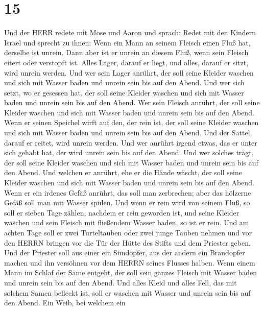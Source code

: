 \hypertarget{section-14}{%
\section{15}\label{section-14}}

 Und der HERR redete mit Mose und Aaron und sprach:
 Redet mit den Kindern Israel und sprecht zu ihnen: Wenn ein
Mann an seinem Fleisch einen Fluß hat, derselbe ist unrein. 
Dann aber ist er unrein an diesem Fluß, wenn sein Fleisch eitert oder
verstopft ist.  Alles Lager, darauf er liegt, und alles,
darauf er sitzt, wird unrein werden.  Und wer sein Lager
anrührt, der soll seine Kleider waschen und sich mit Wasser baden und
unrein sein bis auf den Abend.  Und wer sich setzt, wo er
gesessen hat, der soll seine Kleider waschen und sich mit Wasser baden
und unrein sein bis auf den Abend.  Wer sein Fleisch
anrührt, der soll seine Kleider waschen und sich mit Wasser baden und
unrein sein bis auf den Abend.  Wenn er seinen Speichel
wirft auf den, der rein ist, der soll seine Kleider waschen und sich mit
Wasser baden und unrein sein bis auf den Abend.  Und der
Sattel, darauf er reitet, wird unrein werden.  Und wer
anrührt irgend etwas, das er unter sich gehabt hat, der wird unrein sein
bis auf den Abend. Und wer solches trägt, der soll seine Kleider waschen
und sich mit Wasser baden und unrein sein bis auf den Abend.
 Und welchen er anrührt, ehe er die Hände wäscht, der soll
seine Kleider waschen und sich mit Wasser baden und unrein sein bis auf
den Abend.  Wenn er ein irdenes Gefäß anrührt, das soll man
zerbrechen; aber das hölzerne Gefäß soll man mit Wasser spülen.
 Und wenn er rein wird von seinem Fluß, so soll er sieben
Tage zählen, nachdem er rein geworden ist, und seine Kleider waschen und
sein Fleisch mit fließendem Wasser baden, so ist er rein. 
Und am achten Tage soll er zwei Turteltauben oder zwei junge Tauben
nehmen und vor den HERRN bringen vor die Tür der Hütte des Stifts und
dem Priester geben.  Und der Priester soll aus einer ein
Sündopfer, aus der andern ein Brandopfer machen und ihn versöhnen vor
dem HERRN seines Flusses halben.  Wenn einem Mann im Schlaf
der Same entgeht, der soll sein ganzes Fleisch mit Wasser baden und
unrein sein bis auf den Abend.  Und alles Kleid und alles
Fell, das mit solchem Samen befleckt ist, soll er waschen mit Wasser und
unrein sein bis auf den Abend.  Ein Weib, bei welchem ein
